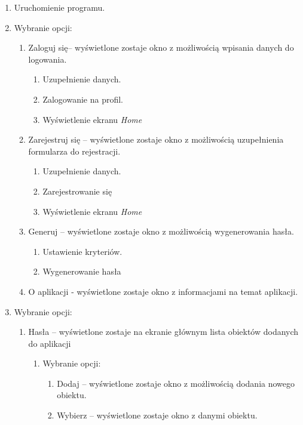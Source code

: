 \documentclass[a4paper]{article}
\begin{document}
\begin{enumerate}
    \item Uruchomienie programu.
    \item Wybranie opcji:\label{eGłówny}
    \begin{enumerate}
        \item Zaloguj się-- wyświetlone zostaje okno z możliwością wpisania danych do logowania.
        \begin{enumerate}
            \item Uzupełnienie danych.
            \item Zalogowanie na profil.
            \item Wyświetlenie ekranu \textit{Home}
        \end{enumerate}
        \item Zarejestruj się -- wyświetlone zostaje okno z możliwością uzupełnienia formularza do rejestracji.
        \begin{enumerate}
            \item Uzupełnienie danych.
            \item Zarejestrowanie się
            \item Wyświetlenie ekranu \textit{Home}
        \end{enumerate}
        \item Generuj -- wyświetlone zostaje okno z możliwością wygenerowania hasła.\label{gen}
        \begin{enumerate}
            \item Ustawienie kryteriów.
            \item Wygenerowanie hasła
        \end{enumerate}
        \item O aplikacji - wyświetlone zostaje okno z informacjami na temat aplikacji.
    \end{enumerate}
    \item Wybranie opcji:
    \begin{enumerate}
        \item Hasła -- wyświetlone zostaje na ekranie głównym lista  obiektów dodanych do aplikacji
        \begin{enumerate}
            \item Wybranie opcji:
            \begin{enumerate}
                \item Dodaj -- wyświetlone zostaje okno z możliwością dodania nowego obiektu.
                \item Wybierz -- wyświetlone zostaje okno z danymi obiektu.

\end{enumerate}
\end{enumerate}
\end{enumerate}
\end{enumerate}
\end{document}
